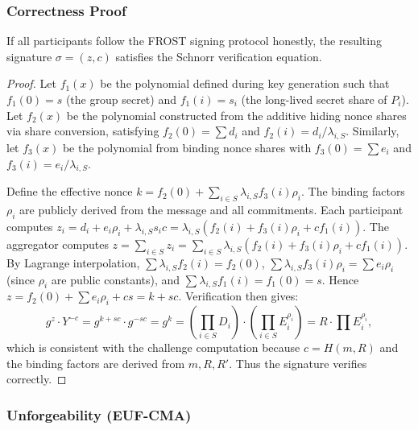 \subsubsection{Correctness Proof}

\begin{theorem}[Correctness]
If all participants follow the FROST signing protocol honestly, the resulting signature \(\sigma=(z,c)\) satisfies the Schnorr verification equation.
\end{theorem}
\begin{proof}
Let \(f_1(x)\) be the polynomial defined during key generation such that \(f_1(0)=s\) (the group secret) and \(f_1(i)=s_i\) (the long-lived secret share of \(P_i\)). Let \(f_2(x)\) be the polynomial constructed from the additive hiding nonce shares via share conversion, satisfying \(f_2(0)=\sum d_i\) and \(f_2(i)=d_i/\lambda_{i,S}\). Similarly, let \(f_3(x)\) be the polynomial from binding nonce shares with \(f_3(0)=\sum e_i\) and \(f_3(i)=e_i/\lambda_{i,S}\).

Define the effective nonce \(k = f_2(0) + \sum_{i\in S} \lambda_{i,S} f_3(i) \rho_i\). The binding factors \(\rho_i\) are publicly derived from the message and all commitments. Each participant computes \(z_i = d_i + e_i\rho_i + \lambda_{i,S}s_i c = \lambda_{i,S}(f_2(i) + f_3(i)\rho_i + c f_1(i))\). The aggregator computes \(z = \sum_{i\in S} z_i = \sum_{i\in S} \lambda_{i,S}(f_2(i) + f_3(i)\rho_i + c f_1(i))\). By Lagrange interpolation, \(\sum \lambda_{i,S} f_2(i) = f_2(0)\), \(\sum \lambda_{i,S} f_3(i)\rho_i = \sum e_i\rho_i\) (since \(\rho_i\) are public constants), and \(\sum \lambda_{i,S} f_1(i) = f_1(0)=s\). Hence \(z = f_2(0) + \sum e_i\rho_i + c s = k + s c\). Verification then gives:
\[
g^z \cdot Y^{-c} = g^{k+sc} \cdot g^{-sc} = g^k = \left(\prod_{i\in S} D_i\right) \cdot \left(\prod_{i\in S} E_i^{\rho_i}\right) = R \cdot \prod E_i^{\rho_i},
\]
which is consistent with the challenge computation because \(c = H(m,R)\) and the binding factors are derived from \(m,R,R'\). Thus the signature verifies correctly.
\end{proof}

\subsubsection{Unforgeability (EUF-CMA)}

